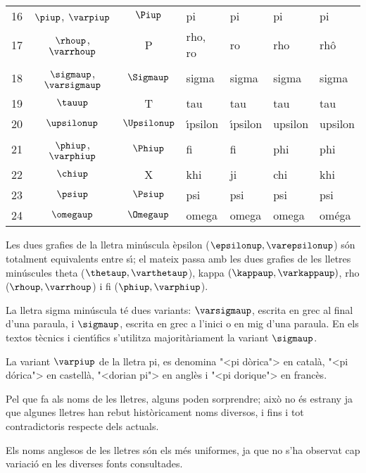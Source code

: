 \begin{table}[h]
\begin{center}
\begin{tabular}{cccllll}
   16 & $\piup$, $\varpiup$ & $\Piup$ & pi & pi &  pi & pi\\
   17 & $\rhoup$, $\varrhoup$ & P & rho, ro & ro &  rho & rh\^{o}\\
   18 & $\sigmaup$, $\varsigmaup$ & $\Sigmaup$ & sigma & sigma &  sigma &sigma\\
   19 & $\tauup$ & T & tau & tau & tau &tau\\
   20 & $\upsilonup$ & $\Upsilonup$ & \'{\i}psilon & \'{\i}psilon &  upsilon &upsilon\\
   21 & $\phiup$, $\varphiup$ & $\Phiup$ & fi & fi &  phi & phi\\
   22 & $\chiup$ & X & khi & ji &  chi & khi\\
   23 & $\psiup$ & $\Psiup$ & psi & psi &  psi & psi\\
   24 & $\omegaup$ & $\Omegaup$ & omega & omega &  omega & om\'{e}ga\\
   \bottomrule[1pt]
   \end{tabular} \end{center}
\end{table}

Les dues grafies de la lletra min\'{u}scula \`{e}psilon  ($\epsilonup,
\varepsilonup$) s\'{o}n totalment equivalents entre s\'{\i}; el mateix passa
amb les dues grafies de les lletres min\'{u}scules theta ($\thetaup,
\varthetaup$), kappa $(\kappaup, \varkappaup)$, rho ($\rhoup,\varrhoup$) i fi ($\phiup, \varphiup$).

La lletra sigma min\'{u}scula t\'{e} dues variants: $\varsigmaup$, escrita en
grec al final d'una paraula, i $\sigmaup$, escrita en grec a l'inici o
en mig d'una paraula. En els textos t\`{e}cnics i cient\'{\i}fics s'utilitza
majorit\`{a}riament la variant $\sigmaup$.

La variant $\varpiup$ de la lletra pi, es denomina {"<}pi d\`{o}rica{">} en
catal\`{a}, {"<}pi d\'{o}rica{">} en castell\`{a}, {"<}dorian pi{">} en angl\`{e}s i {"<}pi dorique{">} en franc\`{e}s.

Pel que fa als noms de les lletres, alguns poden sorprendre; aix\`{o} no
\'{e}s estrany ja que algunes lletres han rebut hist\`{o}ricament noms
diversos, i fins i tot contradictoris respecte dels actuals.

Els noms anglesos de les lletres s\'{o}n els m\'{e}s uniformes, ja que no
s'ha observat cap variaci\'{o} en les diverses fonts consultades.

